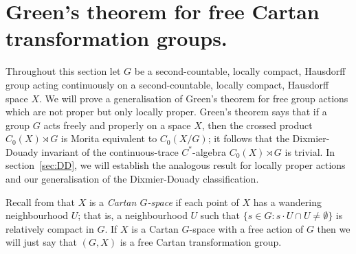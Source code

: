 \documentclass[12pt,a4paper]{amsart}
\newcommand{\Bb}{\mathcal{B}}
\newcommand{\Kk}{\mathcal{K}}
\newcommand{\Hh}{{H}}
\begin{document}
%
%


\section{Green's theorem for free Cartan transformation groups.}\label{sec:green}

Throughout this section let $G$ be a second-countable, locally
compact, Hausdorff group acting continuously on a
second-countable, locally compact, Hausdorff space $X$. We will
prove a generalisation of Green's theorem for free group actions
which are not proper but only locally proper. Green's theorem
says that if a group $G$ acts freely and properly on a space
$X$, then the crossed product $C_0(X)\rtimes G$ is Morita
equivalent to $C_0(X/G)$; it follows that the Dixmier-Douady
invariant of the continuous-trace $C^*$-algebra $C_0(X)\rtimes
G$  is trivial. In section~\ref{sec:DD}, we will establish the
analogous result for locally proper actions and our
generalisation of the Dixmier-Douady classification.

Recall from \cite[Definition~1.1.2]{P} that $X$ is  a
\emph{Cartan $G$-space} if each point of $X$ has a wandering
neighbourhood $U$; that is, a neighbourhood $U$ such that
$\{s\in G:s\cdot U\cap U\neq \emptyset\}$ is relatively compact
in $G$. If $X$ is a Cartan $G$-space with a free action of $G$
then we will just say that $(G,X)$ is a free Cartan
transformation group.
\end{document}
